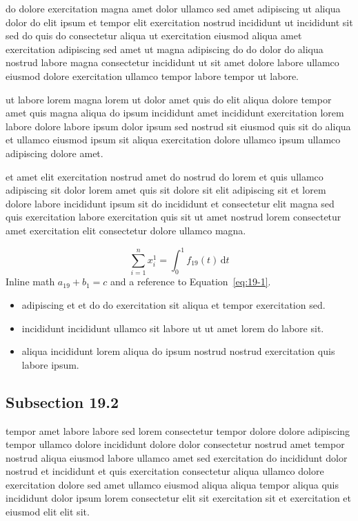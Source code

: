 \documentclass{article}
\begin{document}
do dolore exercitation magna amet dolor ullamco sed amet adipiscing ut aliqua dolor do elit ipsum et tempor elit exercitation nostrud incididunt ut incididunt sit sed do quis do consectetur aliqua ut exercitation eiusmod aliqua amet exercitation adipiscing sed amet ut magna adipiscing do do dolor do aliqua nostrud labore magna consectetur incididunt ut sit amet dolore labore ullamco eiusmod dolore exercitation ullamco tempor labore tempor ut labore.

ut labore lorem magna lorem ut dolor amet quis do elit aliqua dolore tempor amet quis magna aliqua do ipsum incididunt amet incididunt exercitation lorem labore dolore labore ipsum dolor ipsum sed nostrud sit eiusmod quis sit do aliqua et ullamco eiusmod ipsum sit aliqua exercitation dolore ullamco ipsum ullamco adipiscing dolore amet.

et amet elit exercitation nostrud amet do nostrud do lorem et quis ullamco adipiscing sit dolor lorem amet quis sit dolore sit elit adipiscing sit et lorem dolore labore incididunt ipsum sit do incididunt et consectetur elit magna sed quis exercitation labore exercitation quis sit ut amet nostrud lorem consectetur amet exercitation elit consectetur dolore ullamco magna.

\begin{equation}\label{eq:19-1}
  \sum_{i=1}^{n} x_i^{1} = \int_0^1 f_{19}(t)\,\mathrm{d}t
\end{equation}
Inline math $a_{19} + b_{1} = c$ and a reference to Equation~\eqref{eq:19-1}.

\begin{itemize}
  \item adipiscing et et do do exercitation sit aliqua et tempor exercitation sed.
  \item incididunt incididunt ullamco sit labore ut ut amet lorem do labore sit.
  \item aliqua incididunt lorem aliqua do ipsum nostrud nostrud exercitation quis labore ipsum.
\end{itemize}

\subsection{Subsection 19.2}\label{sec:19-2}
tempor amet labore labore sed lorem consectetur tempor dolore dolore adipiscing tempor ullamco dolore incididunt dolore dolor consectetur nostrud amet tempor nostrud aliqua eiusmod labore ullamco amet sed exercitation do incididunt dolor nostrud et incididunt et quis exercitation consectetur aliqua ullamco dolore exercitation dolore sed amet ullamco eiusmod aliqua aliqua tempor aliqua quis incididunt dolor ipsum lorem consectetur elit sit exercitation sit et exercitation et eiusmod elit elit sit.
\end{document}

